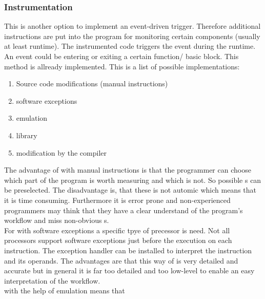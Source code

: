         \subsubsection{Instrumentation}
            \label{SerOpt:Instrumentation}
            This is another option to implement an event-driven trigger.
            Therefore additional instructions are put into the program for
            monitoring certain components (usually at least runtime).
            The instrumented code triggers the event during the runtime.
            An event could be entering or exiting a certain function/
            basic block. This method is allready implemented. This
            is a list of possible implementations:
            \begin{enumerate}
                \item Source code modifications (manual instructions)
                \item software exceptions
                \item emulation
                \item library
                \item modification by the compiler
            \end{enumerate}
            The advantage of  with manual instructions 
            is that the programmer can choose which part of the program is worth
            measuring and which is not. So possible s
            can be preselected.
            The disadvantage is, that these  is not
            automic which means that it is time consuming. Furthermore it is
            error prone and non-experienced programmers may think that they 
            have a clear understand of the program's workflow and miss 
            non-obvious s. \\
            For  with software exceptions a specific
            tpye of precessor is need. Not all processors support software
            exceptions just before the execution on each instruction. The
            exception handler can be installed to interpret the instruction and
            its operands.
            The advantages are that this way of  
            is very detailed and accurate but in general it is far too detailed
            and too low-level to enable an easy interpretation of the workflow. \\
             with the help of emulation means that

